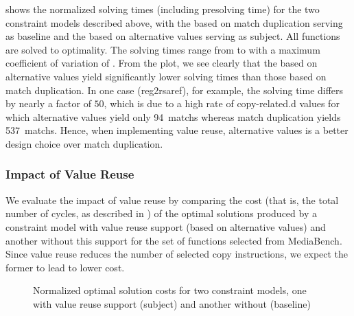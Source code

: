  shows the normalized
solving times (including presolving time) for the two \glspl{constraint
  model} described above, with the  based on
\gls{match duplication} serving as \gls{baseline} and the  based on \glspl{alternative value} serving as \gls{subject}.
%
All \glspl{function} are solved to optimality.
%
The solving times range from
\SIMinOf{
  \AltValuesVsMatchDupPrePlusSolvingTimeSpeedupSolvingTimeAvgMin,
  \AltValuesVsMatchDupPrePlusSolvingTimeSpeedupBaselineSolvingTimeAvgMin
}{\s}
to
\SIMinOf{
  \AltValuesVsMatchDupPrePlusSolvingTimeSpeedupSolvingTimeAvgMax,
  \AltValuesVsMatchDupPrePlusSolvingTimeSpeedupBaselineSolvingTimeAvgMax
}{\s}
with a maximum coefficient of variation of
\numMaxOf{
  \AltValuesVsMatchDupPrePlusSolvingTimeSpeedupPrePlusSolvingTimeCvMax,
  \AltValuesVsMatchDupPrePlusSolvingTimeSpeedupBaselinePrePlusSolvingTimeCvMax%
}.
%
From the plot, we see clearly that the  based on
\glspl{alternative value} yield significantly lower solving times than those
based on \gls{match duplication}.
%
In one case ({\codeFont reg2rsaref}), for example, the solving time differs by
nearly a factor of $50$, which is due to a high rate of \gls{copy-related.d}
values for which \glspl{alternative value} yield only \num{94}~\glspl{match}
whereas \gls{match duplication} yields \num{537}~\glspl{match}.
%
Hence, when implementing \gls{value reuse}, \glspl{alternative value} is a
better design choice over \gls{match duplication}.


\subsubsection{Impact of Value Reuse}

We evaluate the impact of \gls{value reuse} by comparing the cost (that is, the
total number of cycles, as described in ) of
the optimal \glspl{solution} produced by a \gls{constraint model} with
\gls{value reuse} support (based on \glspl{alternative value}) and another
without this support for the set of \glspl{function} selected from
\gls{MediaBench}.
%
Since \gls{value reuse} reduces the number of selected copy \glspl{instruction},
we expect the former to lead to lower cost.

\begin{figure}
  \centering%
  \maxsizebox{\textwidth}{!}{%
    \trimBarchartPlot{%
    }%
  }

  \caption[Plot for evaluating value reuse's impact on code quality]%
          {%
            Normalized optimal solution costs for two constraint models, one
            with value reuse support (subject) and another without (baseline)%
          }
\end{figure}

